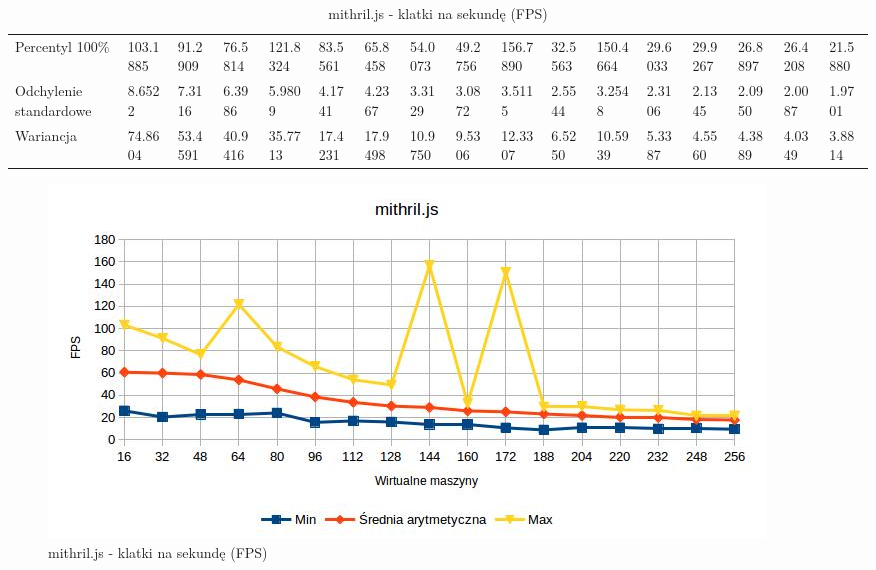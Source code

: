 \documentclass[polish, twoside, 12pt]{mwart}
\begin{document}
\begin{table}[]
{\begin{tabular}{@{}lllllllllllllllll@{}}
  Percentyl 100\%        & 103.1885 & 91.2909 & 76.5814 & 121.8324 & 83.5561 & 65.8458 & 54.0073 & 49.2756 & 156.7890 & 32.5563 & 150.4664 & 29.6033 & 29.9267 & 26.8897 & 26.4208 & 21.5880 \\
  Odchylenie standardowe & 8.6522   & 7.3116  & 6.3986  & 5.9809   & 4.1741  & 4.2367  & 3.3129  & 3.0872  & 3.5115   & 2.5544  & 3.2548   & 2.3106  & 2.1345  & 2.0950  & 2.0087  & 1.9701  \\
  Wariancja              & 74.8604  & 53.4591 & 40.9416 & 35.7713  & 17.4231 & 17.9498 & 10.9750 & 9.5306  & 12.3307  & 6.5250  & 10.5939  & 5.3387  & 4.5560  & 4.3889  & 4.0349  & 3.8814  \\ \bottomrule
  \end{tabular}%
  }
  \caption{mithril.js - klatki na sekundę (FPS)}
\end{table}

\begin{figure}[ht]
  \includegraphics[width=\textwidth]{mithril-fps.jpg}
	\caption{mithril.js - klatki na sekundę (FPS)}
\end{figure}
\end{document}
